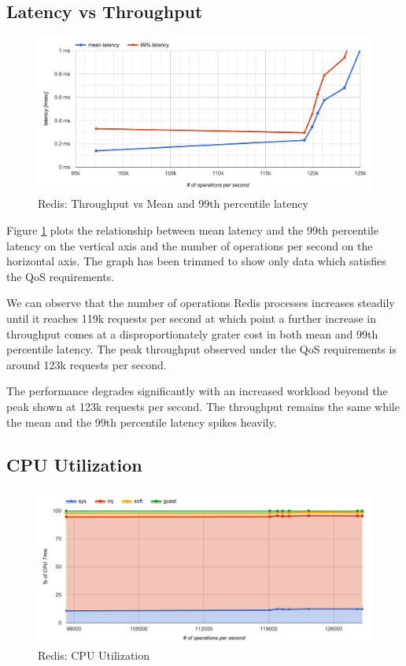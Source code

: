 \subsection{Latency vs Throughput}

\begin{figure}[h]
    \includegraphics[width=\textwidth]{./res/6_default_latency_ops.png}
    \caption{Redis: Throughput vs Mean and 99th percentile latency}
    \label{fig:redis-default-latency-ops}
\end{figure}

Figure \ref{fig:redis-default-latency-ops} plots the relationship between mean latency and the 99th percentile latency on the vertical axis and the number of operations per second on the horizontal axis. The graph has been trimmed to show only data which satisfies the QoS requirements.

We can observe that the number of operations Redis processes increases steadily until it reaches 119k requests per second at which point a further increase in throughput comes at a disproportionately grater cost in both mean and 99th percentile latency. The peak throughput observed under the QoS requirements is around 123k requests per second.

The performance degrades significantly with an increased workload beyond the peak shown at 123k requests per second. The throughput remains the same while the mean and the 99th percentile latency spikes heavily.


\subsection{CPU Utilization}

\begin{figure}[h]
    \includegraphics[width=\textwidth]{./res/6_default_cpu.png}
    \caption{Redis: CPU Utilization}
    \label{fig:redis-default-cpu}
\end{figure}

